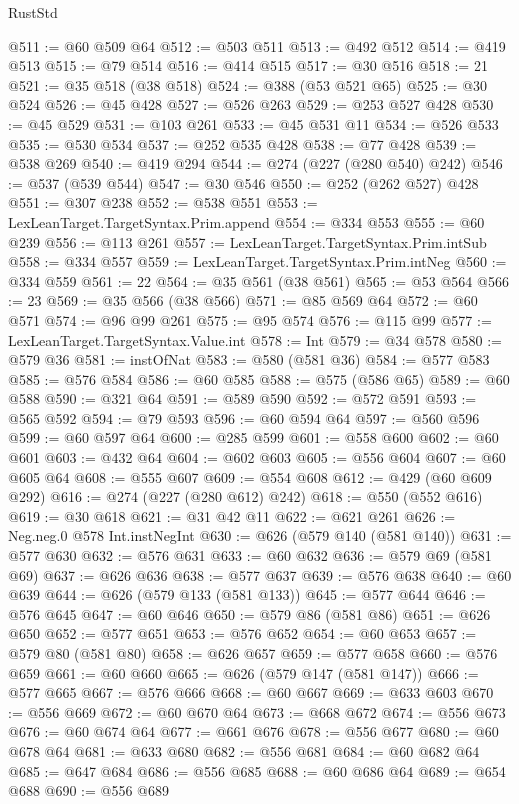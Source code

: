 \begin{lexlean}{RustStd}
\begin{coremodule}
{\begin{coremodule}
{{{{{{{{{{{{{{{{{{{{{{{{{{{{{@511 := @60 @509 @64
@512 := @503 @511
@513 := @492 @512
@514 := @419 @513
@515 := @79 @514
@516 := @414 @515
@517 := @30 @516
@518 := 21
@521 := @35 @518 (@38 @518)
@524 := @388 (@53 @521 @65)
@525 := @30 @524
@526 := @45 @428
@527 := @526 @263
@529 := @253 @527 @428
@530 := @45 @529
@531 := @103 @261
@533 := @45 @531 @11
@534 := @526 @533
@535 := @530 @534
@537 := @252 @535 @428
@538 := @77 @428
@539 := @538 @269
@540 := @419 @294
@544 := @274 (@227 (@280 @540) @242)
@546 := @537 (@539 @544)
@547 := @30 @546
@550 := @252 (@262 @527) @428
@551 := @307 @238
@552 := @538 @551
@553 := LexLeanTarget.TargetSyntax.Prim.append
@554 := @334 @553
@555 := @60 @239
@556 := @113 @261
@557 := LexLeanTarget.TargetSyntax.Prim.intSub
@558 := @334 @557
@559 := LexLeanTarget.TargetSyntax.Prim.intNeg
@560 := @334 @559
@561 := 22
@564 := @35 @561 (@38 @561)
@565 := @53 @564
@566 := 23
@569 := @35 @566 (@38 @566)
@571 := @85 @569 @64
@572 := @60 @571
@574 := @96 @99 @261
@575 := @95 @574
@576 := @115 @99
@577 := LexLeanTarget.TargetSyntax.Value.int
@578 := Int
@579 := @34 @578
@580 := @579 @36
@581 := instOfNat
@583 := @580 (@581 @36)
@584 := @577 @583
@585 := @576 @584
@586 := @60 @585
@588 := @575 (@586 @65)
@589 := @60 @588
@590 := @321 @64
@591 := @589 @590
@592 := @572 @591
@593 := @565 @592
@594 := @79 @593
@596 := @60 @594 @64
@597 := @560 @596
@599 := @60 @597 @64
@600 := @285 @599
@601 := @558 @600
@602 := @60 @601
@603 := @432 @64
@604 := @602 @603
@605 := @556 @604
@607 := @60 @605 @64
@608 := @555 @607
@609 := @554 @608
@612 := @429 (@60 @609 @292)
@616 := @274 (@227 (@280 @612) @242)
@618 := @550 (@552 @616)
@619 := @30 @618
@621 := @31 @42 @11
@622 := @621 @261
@626 := Neg.neg.{0} @578 Int.instNegInt
@630 := @626 (@579 @140 (@581 @140))
@631 := @577 @630
@632 := @576 @631
@633 := @60 @632
@636 := @579 @69 (@581 @69)
@637 := @626 @636
@638 := @577 @637
@639 := @576 @638
@640 := @60 @639
@644 := @626 (@579 @133 (@581 @133))
@645 := @577 @644
@646 := @576 @645
@647 := @60 @646
@650 := @579 @86 (@581 @86)
@651 := @626 @650
@652 := @577 @651
@653 := @576 @652
@654 := @60 @653
@657 := @579 @80 (@581 @80)
@658 := @626 @657
@659 := @577 @658
@660 := @576 @659
@661 := @60 @660
@665 := @626 (@579 @147 (@581 @147))
@666 := @577 @665
@667 := @576 @666
@668 := @60 @667
@669 := @633 @603
@670 := @556 @669
@672 := @60 @670 @64
@673 := @668 @672
@674 := @556 @673
@676 := @60 @674 @64
@677 := @661 @676
@678 := @556 @677
@680 := @60 @678 @64
@681 := @633 @680
@682 := @556 @681
@684 := @60 @682 @64
@685 := @647 @684
@686 := @556 @685
@688 := @60 @686 @64
@689 := @654 @688
@690 := @556 @689
}}}}}}}}}}}}}}}}}}}}}}}}}}}}}
\end{coremodule}}
\end{coremodule}
\end{lexlean}
